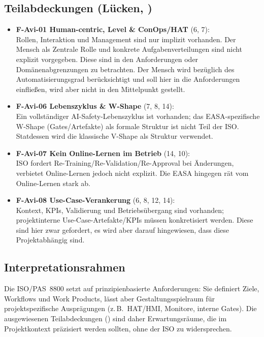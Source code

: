 \subsection{Teilabdeckungen (Lücken, \covT)}
\begin{itemize}
  \item \textbf{F-Avi-01 Human-centric, Level \& ConOps/HAT} (6, 7): \\
  Rollen, Interaktion und Management sind nur implizit vorhanden. Der Mensch als Zentrale Rolle 
  und konkrete Aufgabenverteilungen sind nicht explizit vorgegeben. Diese sind in den Anforderungen 
  oder Domänenabgrenzungen zu betrachten. Der Mensch wird bezüglich des Automatisierungsgrad berücksichtigt 
  und soll hier in die Anforderungen einfließen, wird aber nicht in den Mittelpunkt gestellt.
  \item \textbf{F-Avi-06 Lebenszyklus \& W-Shape} (7, 8, 14): \\
  Ein vollständiger AI-Safety-Lebenszyklus ist vorhanden; das EASA-spezifische W-Shape (Gates/Artefakte) 
  als formale Struktur ist nicht Teil der ISO. Statdessen wird die klassische V-Shape als Struktur verwendet.
  \item \textbf{F-Avi-07 Kein Online-Lernen im Betrieb} (14, 10): \\
  ISO fordert Re-Training/Re-Validation/Re-Approval bei Änderungen, verbietet Online-Lernen jedoch nicht explizit. 
  Die EASA hingegen rät vom Online-Lernen stark ab.
  \item \textbf{F-Avi-08 Use-Case-Verankerung} (6, 8, 12, 14): \\
  Kontext, KPIs, Validierung und Betriebsübergang sind vorhanden; projektinterne Use-Case-Artefakte/KPIs 
  müssen konkretisiert werden. Diese sind hier zwar gefordert, es wird aber darauf hingewiesen, 
  dass diese Projektabhängig sind.
\end{itemize}

\subsection{Interpretationsrahmen}
Die ISO/PAS~8800 setzt auf prinzipienbasierte Anforderungen: Sie definiert Ziele, Workflows und Work Products, lässt aber 
Gestaltungsspielraum für projektspezifische Ausprägungen (z.\,B.\ HAT/HMI, Monitore, interne Gates). 
Die ausgewiesenen Teilabdeckungen (\covT) sind daher Erwartungsräume, die im Projektkontext präzisiert werden sollten, 
ohne der ISO zu widersprechen.

